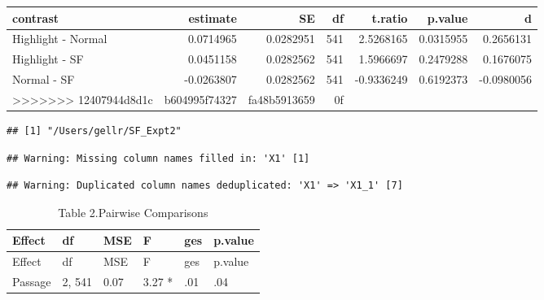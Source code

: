 \documentclass[]{article}
\newenvironment{Shaded}{\begin{snugshade}}{\end{snugshade}}
\newcommand{\CommentTok}[1]{\textcolor[rgb]{0.56,0.35,0.01}{\textit{#1}}}
\newcommand{\DataTypeTok}[1]{\textcolor[rgb]{0.13,0.29,0.53}{#1}}
\newcommand{\KeywordTok}[1]{\textcolor[rgb]{0.13,0.29,0.53}{\textbf{#1}}}
\newcommand{\NormalTok}[1]{#1}
\newcommand{\OperatorTok}[1]{\textcolor[rgb]{0.81,0.36,0.00}{\textbf{#1}}}
\newcommand{\StringTok}[1]{\textcolor[rgb]{0.31,0.60,0.02}{#1}}
\begin{document}
\begin{Shaded}
\end{Shaded}

\begin{longtable}[]{@{}lrrrrrr@{}}
\toprule
contrast & estimate & SE & df & t.ratio & p.value & d\tabularnewline
\midrule
\endhead
Highlight - Normal & 0.0714965 & 0.0282951 & 541 & 2.5268165 & 0.0315955
& 0.2656131\tabularnewline
Highlight - SF & 0.0451158 & 0.0282562 & 541 & 1.5966697 & 0.2479288 &
0.1676075\tabularnewline
Normal - SF & -0.0263807 & 0.0282562 & 541 & -0.9336249 & 0.6192373 &
-0.0980056\tabularnewline
\textgreater{}\textgreater{}\textgreater{}\textgreater{}\textgreater{}\textgreater{}\textgreater{}
12407944d8d1c & b604995f74327 & fa48b5913659 & 0f & & &\tabularnewline
\bottomrule
\end{longtable}

\begin{verbatim}
## [1] "/Users/gellr/SF_Expt2"
\end{verbatim}

\begin{verbatim}
## Warning: Missing column names filled in: 'X1' [1]
\end{verbatim}

\begin{verbatim}
## Warning: Duplicated column names deduplicated: 'X1' => 'X1_1' [7]
\end{verbatim}

\begin{longtable}[]{@{}llllll@{}}
\caption{Table 2.Pairwise Comparisons}\tabularnewline
\toprule
Effect & df & MSE & F & ges & p.value\tabularnewline
\midrule
\endfirsthead
\toprule
Effect & df & MSE & F & ges & p.value\tabularnewline
\midrule
\endhead
Passage & 2, 541 & 0.07 & 3.27 * & .01 & .04\tabularnewline
\bottomrule
\end{longtable}
\end{document}
